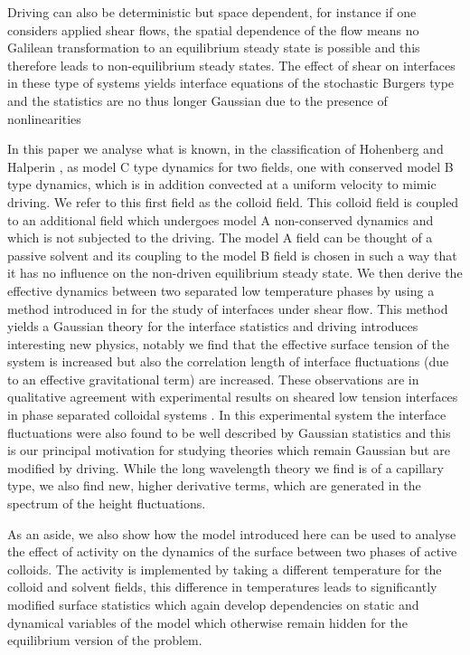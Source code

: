 Driving can also be deterministic but space dependent, for instance if one considers applied shear flows, the spatial dependence of the flow means no Galilean transformation to an equilibrium steady state is possible and this therefore leads to non-equilibrium steady states. The effect of shear on interfaces in these type of systems yields interface equations of the stochastic Burgers type and the statistics are no thus longer Gaussian due to the presence of nonlinearities \cite{bray_interface_2001,bray_interface_2001-1,smith_interfaces_2008,smith_lateral_2010,thiebaud_nonequilibrium_2010,thiebaud_nonlinear_2014}


In this paper we analyse what is known, in the classification of Hohenberg and Halperin \cite{hohenberg_theory_1977}, as model C type dynamics for two fields, one with conserved model B type dynamics, which is in addition convected at a uniform velocity to mimic driving. We refer to this first field as the colloid field.
This colloid field is coupled to an additional field which undergoes model A non-conserved dynamics and which is not subjected to the driving. The model A field can be thought of a passive solvent and its coupling to the model B field is chosen in such a way that it has no influence on the non-driven equilibrium steady state. We then derive the effective dynamics between two separated low temperature phases by using a
method introduced in \cite{bray_interface_2001,bray_interface_2001-1} for the study of interfaces under shear flow. This method yields a Gaussian theory for the interface statistics and driving introduces interesting new physics, notably we find that the effective surface tension of the system is increased but also the correlation length of interface fluctuations (due to an effective gravitational term) are increased. These observations are in qualitative agreement with experimental results on sheared low tension interfaces in phase separated colloidal systems \cite{derks_suppression_2006}. In this experimental system the interface fluctuations were also found to be well described by Gaussian statistics and this is our principal motivation for studying theories which remain Gaussian but are  modified by driving. While the long wavelength theory we find is of a capillary type, we also find new, higher derivative terms, which  are generated in the spectrum of the height fluctuations. 

As an aside, we also show how the model introduced here can be used to analyse the effect of activity on the dynamics of the surface between two phases of active colloids. The activity is implemented by taking a different temperature for the colloid and solvent fields, this difference in temperatures leads to significantly modified surface statistics which again develop dependencies on static and dynamical variables of the model which otherwise remain hidden for the equilibrium version of the problem.

